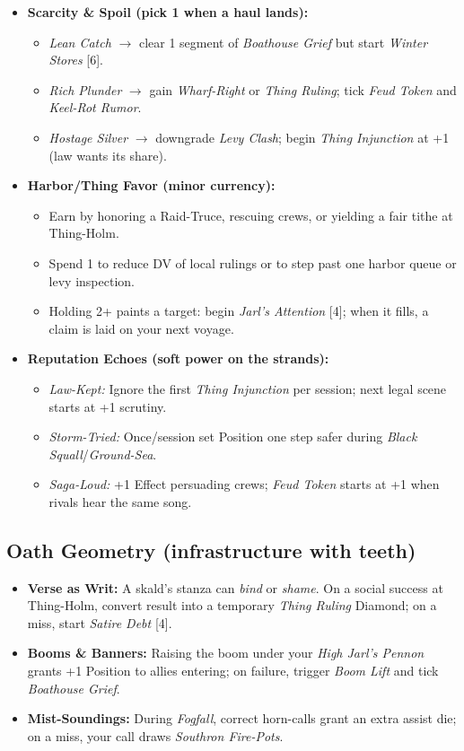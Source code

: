 \begin{itemize}
  \item \textbf{Scarcity \& Spoil (pick 1 when a haul lands):}
  \begin{itemize}
    \item \emph{Lean Catch} $\rightarrow$ clear 1 segment of \emph{Boathouse Grief} but start \emph{Winter Stores} [6].
    \item \emph{Rich Plunder} $\rightarrow$ gain \emph{Wharf-Right} or \emph{Thing Ruling}; tick \emph{Feud Token} and \emph{Keel-Rot Rumor}.
    \item \emph{Hostage Silver} $\rightarrow$ downgrade \emph{Levy Clash}; begin \emph{Thing Injunction} at +1 (law wants its share).
  \end{itemize}

  \item \textbf{Harbor/Thing Favor (minor currency):}
  \begin{itemize}
    \item Earn by honoring a Raid-Truce, rescuing crews, or yielding a fair tithe at Thing-Holm.
    \item Spend 1 to reduce DV of local rulings or to step past one harbor queue or levy inspection.
    \item Holding 2+ paints a target: begin \emph{Jarl’s Attention} [4]; when it fills, a claim is laid on your next voyage.
  \end{itemize}

  \item \textbf{Reputation Echoes (soft power on the strands):}
  \begin{itemize}
    \item \emph{Law-Kept:} Ignore the first \emph{Thing Injunction} per session; next legal scene starts at +1 scrutiny.
    \item \emph{Storm-Tried:} Once/session set Position one step safer during \emph{Black Squall}/\emph{Ground-Sea}.
    \item \emph{Saga-Loud:} +1 Effect persuading crews; \emph{Feud Token} starts at +1 when rivals hear the same song.
  \end{itemize}
\end{itemize}

\subsection*{Oath Geometry (infrastructure with teeth)}
\begin{itemize}
  \item \textbf{Verse as Writ:} A skald’s stanza can \emph{bind} or \emph{shame}. On a social success at Thing-Holm, convert result into a temporary \emph{Thing Ruling} Diamond; on a miss, start \emph{Satire Debt} [4].
  \item \textbf{Booms \& Banners:} Raising the boom under your \emph{High Jarl’s Pennon} grants +1 Position to allies entering; on failure, trigger \emph{Boom Lift} and tick \emph{Boathouse Grief}.
  \item \textbf{Mist-Soundings:} During \emph{Fogfall}, correct horn-calls grant an extra assist die; on a miss, your call draws \emph{Southron Fire-Pots}.
\end{itemize}

